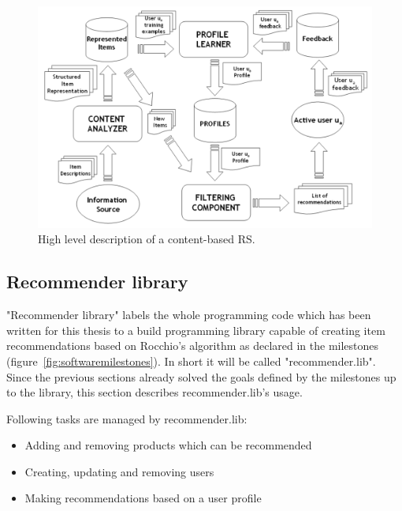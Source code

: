 \begin{figure}[h]
    \center
    \includegraphics[scale=0.4,clip=true,trim=24px 0 15px 0]{inc/implementation/HighlevelContentBased}
    \caption{High level description of a content-based RS.\citep[p.~76]{lops:2011}}
    \label{fig:framework-contentbasedrs}
\end{figure}



\FloatBarrier

\FloatBarrier

\FloatBarrier

\subsection{Recommender library}
"Recommender library" labels the whole programming code which has been written for this thesis to a build programming library capable of creating item recommendations based on Rocchio's algorithm as declared in the milestones (figure~\ref{fig:softwaremilestones}).
In short it will be called "recommender.lib".
Since the previous sections already solved the goals defined by the milestones up to the library, this section describes recommender.lib's usage.

Following tasks are managed by recommender.lib:
\begin{itemize}
    \item Adding and removing products which can be recommended
    \item Creating, updating and removing users
    \item Making recommendations based on a user profile
\end{itemize}


